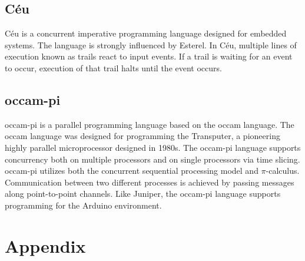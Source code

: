 \documentclass{sigplanconf}
\begin{document}
\subsection{C\'eu}
C\'eu \citep{ceu} is a concurrent imperative programming language designed for embedded systems. The language is strongly influenced by Esterel. In C\'eu, multiple lines of execution known as trails react to input events. If a trail is waiting for an event to occur, execution of that trail halts until the event occurs.

\subsection{occam-pi}
occam-pi \citep{occampi} is a parallel programming language based on the occam language. The occam language was designed for programming the Transputer, a pioneering highly parallel microprocessor designed in 1980s. The occam-pi language supports concurrency both on multiple processors and on single processors via time slicing. occam-pi utilizes both the concurrent sequential processing model and $\pi$-calculus. Communication between two different processes is achieved by passing messages along point-to-point channels. Like Juniper, the occam-pi language supports programming for the Arduino environment.

\clearpage

\appendix
\section{Appendix}
\end{document}
